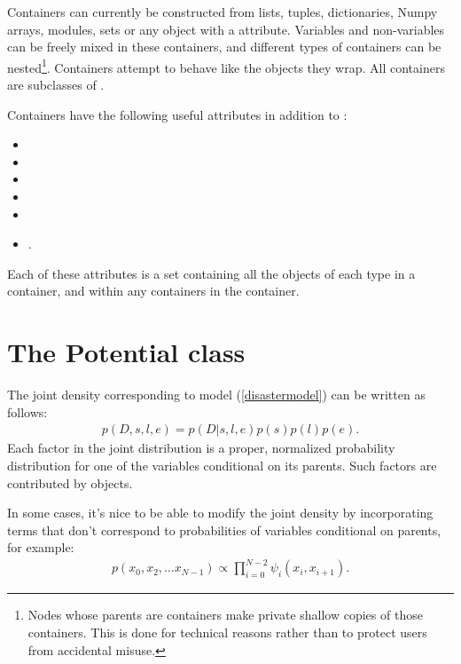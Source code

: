 Containers can currently be constructed from lists, tuples, dictionaries, Numpy arrays, modules, sets or any object with a  attribute. Variables and non-variables can be freely mixed in these containers, and different types of containers can be nested\footnote{Nodes whose parents are containers make private shallow copies of those containers. This is done for technical reasons rather than to protect users from accidental misuse.}. Containers attempt to behave like the objects they wrap. All containers are subclasses of . 

Containers have the following useful attributes in addition to :
\begin{itemize}
    \item{}
    \item{}
    \item{}
    \item{}
    \item{}
    \item{}.
\end{itemize}
Each of these attributes is a set containing all the objects of each type in a container, and within any containers in the container.


\hypertarget{potential}{}
\section*{The Potential class} \label{potential}


The joint density corresponding to model (\ref{disastermodel}) can be written as follows:
\begin{eqnarray*}
    p(D,s,l,e) = p(D|s,l,e) p(s) p(l) p(e).
\end{eqnarray*}
Each factor in the joint distribution is a proper, normalized probability distribution for one of the variables conditional on its parents. Such factors are contributed by  objects.

In some cases, it's nice to be able to modify the joint density by incorporating terms that don't correspond to probabilities of variables conditional on parents, for example:
\begin{eqnarray*}
    p(x_0, x_2, \ldots x_{N-1}) \propto \prod_{i=0}^{N-2} \psi_i(x_i, x_{i+1}).
\end{eqnarray*}


